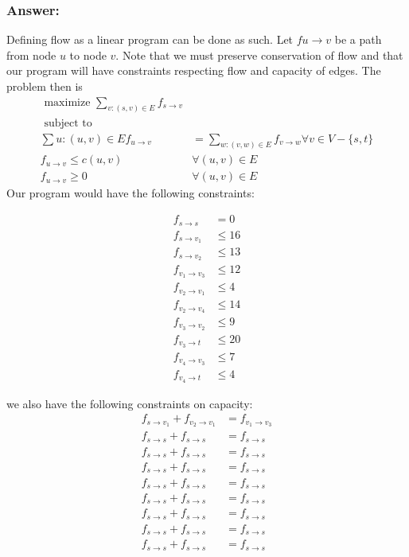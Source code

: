 \documentclass[titlepage]{article}\usepackage[]{graphicx}\usepackage[]{color}
\begin{document}
  \subsubsection{Answer:}
  Defining flow as a linear program can be done as such. 
  Let $f{u \to v} $ be a path from node $u$ to node $v$. Note that we must
  preserve conservation of flow and that our program will have constraints
  respecting flow and capacity of edges.
  The problem then is 
  \begin{align}
    \text{ maximize } \sum_{v:(s,v) \in E} f_{s \to v} &\\
    \text{ subject to } \\
    \sum{u:(u,v)\in E} f_{u \to v} & = \sum_{w:(v,w) \in E} f_{v \to w} \forall v \in V - \{s,t\} \\
    f_{u \to v} \leq c(u,v)& \forall (u,v) \in E\\
    f_{u \to v} \geq 0 & \forall (u,v) \in E
  \end{align}
  Our program would have the following constraints:

  \begin{equation}
    \begin{aligned}
      f_{s \to s} &= 0 \\
      f_{s \to v_1} &\leq 16  \\
      f_{s \to v_2} &\leq 13   \\
      f_{v_1 \to v_3} &\leq 12  \\
      f_{v_2 \to v_1} &\leq 4  \\
      f_{v_2 \to v_4} &\leq 14  \\
      f_{v_3 \to v_2} &\leq 9  \\
      f_{v_3 \to t} &\leq 20  \\
      f_{v_4 \to v_3} &\leq  7 \\
      f_{v_4 \to t} &\leq  4 
    \end{aligned}
  \end{equation}

  we also have the following constraints on capacity:
  \begin{equation}
    \begin{aligned}
      f_{s \to v_1} + f_{v_2 \to v_1} &=  f_{v_1 \to v_3} \\
      f_{s \to s} + f_{s \to s} &=  f_{s \to s} \\
      f_{s \to s} + f_{s \to s} &=  f_{s \to s} \\
      f_{s \to s} + f_{s \to s} &=  f_{s \to s} \\
      f_{s \to s} + f_{s \to s} &=  f_{s \to s} \\
      f_{s \to s} + f_{s \to s} &=  f_{s \to s} \\
      f_{s \to s} + f_{s \to s} &=  f_{s \to s} \\
      f_{s \to s} + f_{s \to s} &=  f_{s \to s} \\
      f_{s \to s} + f_{s \to s} &=  f_{s \to s}
    \end{aligned}
  \end{equation}
\end{document}
